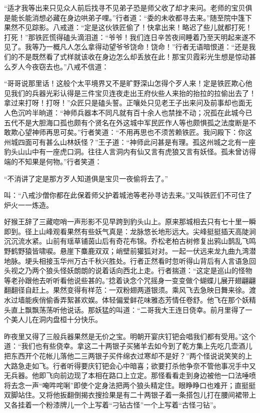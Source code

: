 \documentclass[12pt,UTF8]{ctexbook}
\begin{document}
{	“适才我等出来只见众人前后找寻不见弟子恐是师父收了却才来问。老师的宝贝俱是能长能消想必藏在身边哄弟子哩。”行者道：“委的未收都寻去来。”随至院中篷下果然不见踪影。八戒道：“定是这伙铁匠偷了！快拿出来！略迟了些儿就都打死！打死！”那铁匠慌得磕头滴泪道：“爷爷！我们连日辛苦夜间睡着乃至天明起来遂不见了。我等乃一概凡人怎么拿得动望爷爷饶命！饶命！”行者无语暗恨道：“还是我们的不是既然看了式样就该收在身边怎么却丢放在此！那宝贝霞彩光生想是惊动甚么歹人今夜窃去也。”八戒不信道：
	
	“哥哥说那里话！这般个太平境界又不是旷野深山怎得个歹人来！定是铁匠欺心他见我们的兵器光彩认得是三件宝贝连夜走出王府伙些人来抬的抬拉的拉偷出去了！拿过来打呀！打呀！”众匠只是磕头誓。正嚷处只见老王子出来问及前事却也面无人色沉吟半晌道：“神师兵器本不同凡就有百十余人也禁挫不动；况孤在此城今已五代不是大胆海口孤也颇有个贤名在外这城中军民匠作人等也颇惧孤之法度断是不敢欺心望神师再思可矣。”行者笑道：“不用再思也不须苦赖铁匠。我问殿下：你这州城四面可有甚么山林妖怪？”王子道：“神师此问甚是有理。孤这州城之北有一座豹头山山中有一座虎口洞。往往人言洞内有仙又言有虎狼又言有妖怪。孤未曾访得端的不知果是何物。”行者笑道：
	
	“不消讲了定是那方歹人知道俱是宝贝一夜偷将去了。”
	
	叫：“八戒沙僧你都在此保着师父护着城池等老孙寻访去来。”又叫铁匠们不可住了炉火一一炼造。
	
	好猴王辞了三藏唿哨一声形影不见早跨到豹头山上。原来那城相去只有七十里一瞬即到。径上山峰观看果然有些妖气真是：龙脉悠长地形远大。尖峰挺挺插天高陡涧沉沉流水紧。山前有瑶草铺茵山后有奇花布锦。乔松老柏古树修复出鸦山鹊乱飞鸣野鹤野猿皆啸唳。悬崖下麋鹿双双；峭壁前獾狐对对。一起一伏远来龙九曲九湾潜地脉。埂头相接玉华州万古千秋兴胜处。行者正然看时忽听得山背后有人言语急回头视之乃两个狼头怪妖朗朗的说着话向西北上走。行者揣道：“这定是巡山的怪物等老孙跟他去听听看他说些甚的。”捻着诀念个咒摇身一变变做个蝴蝶儿展开翅翩翩翻翻径自赶上。果然变得有样范：一双粉翅两道银须。乘风飞去急映日舞来徐。渡水过墙能疾俏偷香弄絮甚欢娱。体轻偏爱鲜花味雅态芳情任卷舒。他飞在那个妖精头直上飘飘荡荡听他说话。那妖猛的叫道：“二哥我大王连日侥幸。前月里得了一个美人儿在洞内盘桓十分快乐。
	
	昨夜里又得了三般兵器果然是无价之宝。明朝开宴庆钉钯会唱我们都有受用。”这个道：“我们也有些侥幸。拿这二十两银子买猪羊去如今到了乾方集上先吃几壶酒儿把东西开个花帐儿落他二三两银子买件绵衣过寒却不是好？”两个怪说说笑笑的上大路急走如飞。行者听得要庆钉钯会心中暗喜；欲要打杀他争奈不管他事况手中又无兵器。他即飞向前边现了本相在路口上立定。那怪看看走到身边被他一口法唾喷将去念一声“唵吽咤唎”即使个定身法把两个狼头精定住。眼睁睁口也难开；直挺挺双脚站住。又将他扳翻倒揭衣搜捡果是有二十两银子着一条搭包儿打在腰间裙带上又各挂着一个粉漆牌儿一个上写着“刁钻古怪”一个上写着“古怪刁钻”。
	
}
\end{document}
